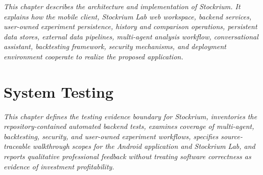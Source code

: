 \documentclass[12pt,a4paper,oneside]{report}
\begin{document}
\textit{This chapter describes the architecture and implementation of Stockrium. It explains how the mobile client, Stockrium Lab web workspace, backend services, user-owned experiment persistence, history and comparison operations, persistent data stores, external data pipelines, multi-agent analysis workflow, conversational assistant, backtesting framework, security mechanisms, and deployment environment cooperate to realize the proposed application.}















\clearpage
\chapter{System Testing}

\textit{This chapter defines the testing evidence boundary for Stockrium, inventories the repository-contained automated backend tests, examines coverage of multi-agent, backtesting, security, and user-owned experiment workflows, specifies source-traceable walkthrough scopes for the Android application and Stockrium Lab, and reports qualitative professional feedback without treating software correctness as evidence of investment profitability.}
\end{document}
